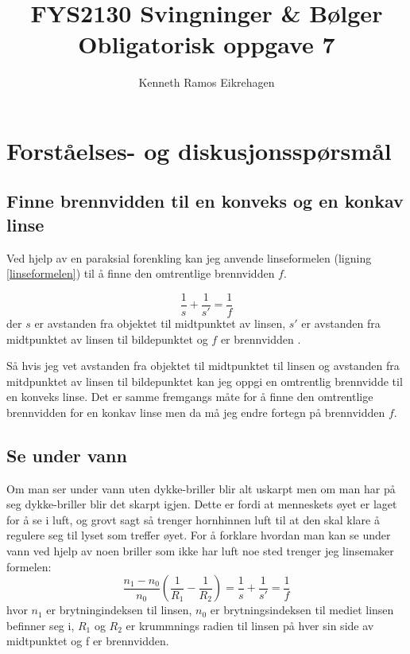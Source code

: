 \documentclass[a4paper,12pt,norsk]{article}
\title{FYS2130 Svingninger \& Bølger \\Obligatorisk oppgave 7}
\author{Kenneth Ramos Eikrehagen}
\begin{document}
\maketitle
\newpage
\tableofcontents
\listoffigures
\newpage


\section{Forståelses- og diskusjonsspørsmål}

\subsection{Finne brennvidden til en konveks og en konkav linse}
Ved hjelp av en paraksial forenkling kan jeg anvende linseformelen (ligning \vref{linseformelen}) til å finne den omtrentlige brennvidden $f$.

\begin{equation}
\frac{1}{s} + \frac{1}{s'} = \frac{1}{f}
\label{linseformelen}
\end{equation}
der $s$ er avstanden fra objektet til midtpunktet av linsen, $s'$ er avstanden fra midtpunktet av linsen til bildepunktet og $f$ er brennvidden \cite{boka}. 

Så hvis jeg vet avstanden fra objektet til midtpunktet til linsen og avstanden fra mitdpunktet av linsen til bildepunktet kan jeg oppgi en omtrentlig brennvidde til en konveks linse. Det er samme fremgangs måte for å finne den omtrentlige brennvidden for en konkav linse men da må jeg endre fortegn på brennvidden $f$.

\subsection{Se under vann}
Om man ser under vann uten dykke-briller blir alt uskarpt men om man har på seg dykke-briller blir det skarpt igjen. Dette er fordi at menneskets øyet er laget for å se i luft, og grovt sagt så trenger hornhinnen luft til at den skal klare å regulere seg til lyset som treffer øyet. 
For å forklare hvordan man kan se under vann ved hjelp av noen briller som ikke har luft noe sted trenger jeg linsemaker formelen:
\begin{equation}
\frac{n_1-n_0}{n_0}\left( \frac{1}{R_1} - \frac{1}{R_2}\right) = \frac{1}{s} + \frac{1}{s'}= \frac{1}{f}
\label{linsemakerformelen}
\end{equation}
hvor $n_1$ er brytningindeksen til linsen, $n_0$ er brytningsindeksen til mediet linsen befinner seg i, $R_1$ og $R_2$ er krummnings radien til linsen på hver sin side av midtpunktet og f er brennvidden.
\end{document}
